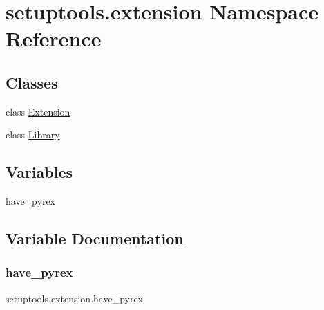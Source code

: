 \hypertarget{namespacesetuptools_1_1extension}{}\section{setuptools.\+extension Namespace Reference}
\label{namespacesetuptools_1_1extension}
\subsection*{Classes}
\begin{DoxyCompactItemize}
\item 
class \hyperlink{classsetuptools_1_1extension_1_1Extension}{Extension}
\item 
class \hyperlink{classsetuptools_1_1extension_1_1Library}{Library}
\end{DoxyCompactItemize}
\subsection*{Variables}
\begin{DoxyCompactItemize}
\item 
\hyperlink{namespacesetuptools_1_1extension_a50aa9312d90ca37835ca48bd6a0110e2}{have\+\_\+pyrex}
\end{DoxyCompactItemize}


\subsection{Variable Documentation}
\mbox{\label{namespacesetuptools_1_1extension_a50aa9312d90ca37835ca48bd6a0110e2}} 
\subsubsection{\texorpdfstring{have\+\_\+pyrex}{have\_pyrex}}
{\footnotesize\ttfamily setuptools.\+extension.\+have\+\_\+pyrex}

